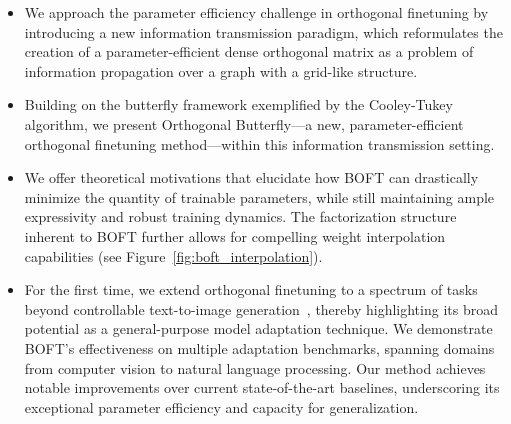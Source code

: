 \begin{itemize}[leftmargin=*,nosep]
    \item We approach the parameter efficiency challenge in orthogonal finetuning by introducing a new information transmission paradigm, which reformulates the creation of a parameter-efficient dense orthogonal matrix as a problem of information propagation over a graph with a grid-like structure.
    \item Building on the butterfly framework exemplified by the Cooley-Tukey algorithm, we present Orthogonal Butterfly—a new, parameter-efficient orthogonal finetuning method—within this information transmission setting.
    \item We offer theoretical motivations that elucidate how BOFT can drastically minimize the quantity of trainable parameters, while still maintaining ample expressivity and robust training dynamics. The factorization structure inherent to BOFT further allows for compelling weight interpolation capabilities (see Figure~\ref{fig:boft_interpolation}).
    \item For the first time, we extend orthogonal finetuning to a spectrum of tasks beyond controllable text-to-image generation~\cite{qiu2023controlling}, thereby highlighting its broad potential as a general-purpose model adaptation technique. We demonstrate BOFT's effectiveness on multiple adaptation benchmarks, spanning domains from computer vision to natural language processing. Our method achieves notable improvements over current state-of-the-art baselines, underscoring its exceptional parameter efficiency and capacity for generalization.
\end{itemize}

